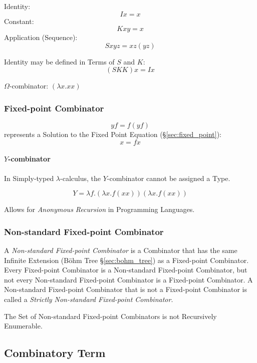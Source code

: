 Identity:
\[
  I x = x
\]
Constant:
\[
  K x y = x
\]
Application (Sequence):
\[
  S x y z = x z (y z)
\]

Identity may be defined in Terms of $S$ and $K$:
\[
  (S K K) x = I x
\]

$\Omega$-combinator: $(\lambda x. x x)$



\subsubsection{Fixed-point Combinator}\label{sec:fixedpoint_combinator}

\[
  y f = f (y f)
\]
represents a Solution to the Fixed Point Equation
(\S\ref{sec:fixed_point}):
\[
  x = f x
\]



\paragraph{$Y$-combinator}\label{sec:y_combinator}\hfill

In Simply-typed $\lambda$-calculus, the $Y$-combinator cannot be
assigned a Type.

\[
  Y = \lambda f.(\lambda x.f (x x)) (\lambda x.f (x x))
\]

Allows for \emph{Anonymous Recursion} in Programming Languages.



\subsubsection{Non-standard Fixed-point Combinator}
\label{sec:nonstandard_combinator}

A \emph{Non-standard Fixed-point Combinator} is a Combinator that has
the same Infinite Extension (B\"ohm Tree \S\ref{sec:bohm_tree}) as a
Fixed-point Combinator. Every Fixed-point Combinator is a Non-standard
Fixed-point Combinator, but not every Non-standard Fixed-point
Combinator is a Fixed-point Combinator. A Non-standard Fixed-point
Combinator that is not a Fixed-point Combinator is called a
\emph{Strictly Non-standard Fixed-point Combinator}.

The Set of Non-standard Fixed-point Combinators is not Recursively
Enumerable. \cite{goldberg05}



\subsection{Combinatory Term}\label{sec:combinatory_term}

